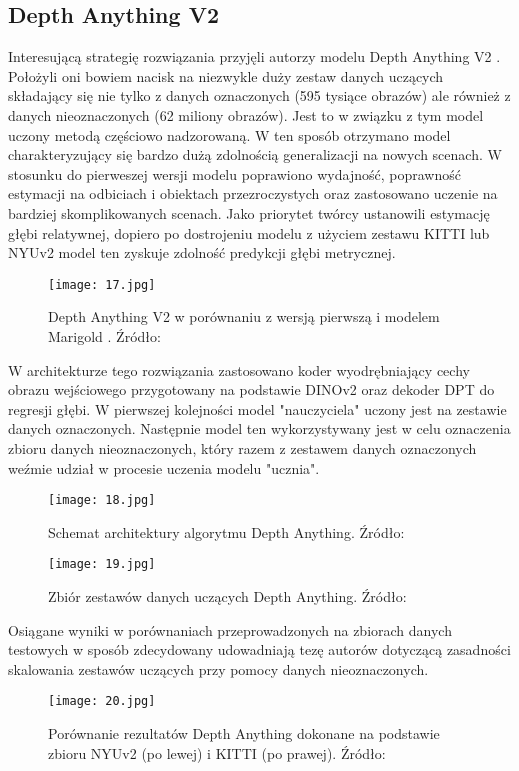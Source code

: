 \subsection{Depth Anything V2}
Interesującą strategię rozwiązania przyjęli autorzy modelu Depth Anything V2 \cite{yang2024depth}. Położyli oni bowiem nacisk na niezwykle duży zestaw danych uczących składający się nie tylko z danych oznaczonych (595 tysiące obrazów) ale również z danych nieoznaczonych (62 miliony obrazów). Jest to w związku z tym model uczony metodą częściowo nadzorowaną. W ten sposób otrzymano model charakteryzujący się bardzo dużą zdolnością generalizacji na nowych scenach. W stosunku do pierweszej wersji modelu \cite{yang2024depthv1} poprawiono wydajność, poprawność estymacji na odbiciach i obiektach przezroczystych oraz zastosowano uczenie na bardziej skomplikowanych scenach. Jako priorytet twórcy ustanowili estymację głębi relatywnej, dopiero po dostrojeniu modelu z użyciem zestawu KITTI lub NYUv2 model ten zyskuje zdolność predykcji głębi metrycznej.
\begin{figure}[H]
    \centering
    \texttt{[image: 17.jpg]}
    \caption{Depth Anything V2 w porównaniu z wersją pierwszą i modelem Marigold \cite{ke2024repurposing}. Źródło: \cite{yang2024depth}}
    \label{depth-anything}
\end{figure}
W architekturze tego rozwiązania zastosowano koder wyodrębniający cechy obrazu wejściowego przygotowany na podstawie DINOv2 \cite{oquab2024} oraz dekoder DPT do regresji głębi. W pierwszej kolejności model "nauczyciela" uczony jest na zestawie danych oznaczonych. Następnie model ten wykorzystywany jest w celu oznaczenia zbioru danych nieoznaczonych, który razem z zestawem danych oznaczonych weźmie udział w procesie uczenia modelu "ucznia".
\begin{figure}[H]
    \centering
    \texttt{[image: 18.jpg]}
    \caption{Schemat architektury algorytmu Depth Anything. Źródło: \cite{yang2024depth}}
    \label{fig:depth-anything-schema}
\end{figure}
\begin{figure}[H]
    \centering
    \texttt{[image: 19.jpg]}
    \caption{Zbiór zestawów danych uczących Depth Anything. Źródło: \cite{yang2024depth}}
    \label{fig:depth-anything-data}
\end{figure}
Osiągane wyniki w porównaniach przeprowadzonych na zbiorach danych testowych w sposób zdecydowany udowadniają tezę autorów dotyczącą zasadności skalowania zestawów uczących przy pomocy danych nieoznaczonych.
\begin{figure}[H]
    \centering
    \texttt{[image: 20.jpg]}
    \caption{Porównanie rezultatów Depth Anything dokonane na podstawie zbioru NYUv2 (po lewej) i KITTI (po prawej). Źródło: \cite{yang2024depth}}
    \label{fig:depth-anything-results}
\end{figure}

